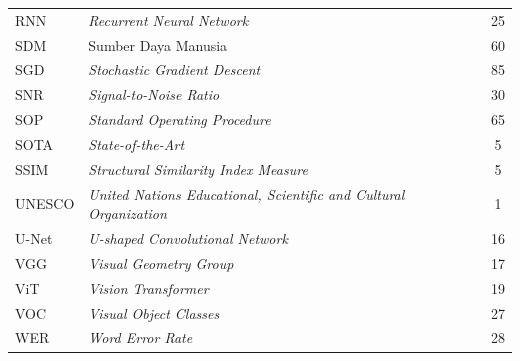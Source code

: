 \begin{longtable}{@{} l >{\raggedright\arraybackslash}p{7.5cm} c @{}}
RNN & \textit{Recurrent Neural Network}  & 25 \\
SDM & Sumber Daya Manusia & 60 \\
SGD & \textit{Stochastic Gradient Descent} & 85 \\
SNR & \textit{Signal-to-Noise Ratio}  & 30 \\
SOP & \textit{Standard Operating Procedure}  & 65 \\
SOTA & \textit{State-of-the-Art} & 5 \\
SSIM & \textit{Structural Similarity Index Measure} & 5 \\
UNESCO & \textit{United Nations Educational, Scientific and Cultural Organization} & 1 \\
U-Net & \textit{U-shaped Convolutional Network} & 16 \\
VGG & \textit{Visual Geometry Group} & 17 \\
ViT & \textit{Vision Transformer} & 19 \\
VOC & \textit{Visual Object Classes} & 27 \\
WER & \textit{Word Error Rate} & 28 \\

\end{longtable}

\newpage


\label{subsec:daftar-lambang}
\vspace{0.8em}

